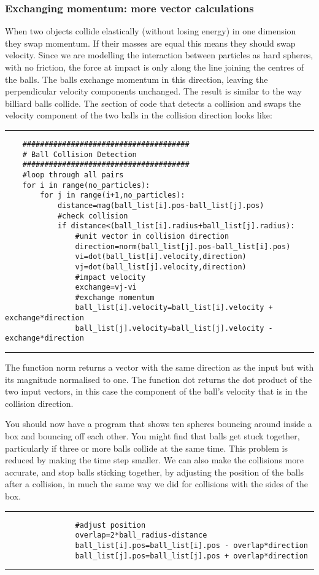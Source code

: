 \documentclass[12pt]{article}
\begin{document}
\subsubsection{Exchanging momentum: more vector calculations}
When two objects collide elastically (without losing energy) in one dimension they swap momentum.
If their masses are equal this means they should swap velocity.
Since we are modelling the interaction between particles as hard spheres,
with no friction, the force at impact is only along the line joining the centres of the balls.
The balls exchange momentum in this direction,
leaving the perpendicular velocity components unchanged.
The result is similar to the way billiard balls collide.
The section of code that detects a collision and swaps the velocity component of the two balls
in the collision direction looks like:
{\color{code}\hrule
\begin{verbatim}
    ######################################
    # Ball Collision Detection
    ######################################
    #loop through all pairs
    for i in range(no_particles):
        for j in range(i+1,no_particles):
            distance=mag(ball_list[i].pos-ball_list[j].pos)
            #check collision
            if distance<(ball_list[i].radius+ball_list[j].radius):
                #unit vector in collision direction
                direction=norm(ball_list[j].pos-ball_list[i].pos)
                vi=dot(ball_list[i].velocity,direction)
                vj=dot(ball_list[j].velocity,direction)
                #impact velocity
                exchange=vj-vi
                #exchange momentum
                ball_list[i].velocity=ball_list[i].velocity + exchange*direction
                ball_list[j].velocity=ball_list[j].velocity - exchange*direction
\end{verbatim}\hrule}
The function {\color{code}norm} returns a vector with the same direction as the input
but with its magnitude normalised to one.
The function {\color{code}dot} returns the dot product of the two input vectors,
in this case the component of the ball's velocity that is in the collision direction.

You should now have a program that shows ten spheres bouncing around inside a box
and bouncing off each other.
You might find that balls get stuck together,
particularly if three or more balls collide at the same time.
This problem is reduced by making the time step smaller.
We can also make the collisions more accurate, and stop balls sticking together,
by adjusting the position of the balls after a collision, in much the same way we did
for collisions with the sides of the box.
{\color{code}\hrule
\begin{verbatim}
                #adjust position
                overlap=2*ball_radius-distance
                ball_list[i].pos=ball_list[i].pos - overlap*direction
                ball_list[j].pos=ball_list[j].pos + overlap*direction
\end{verbatim}\hrule}
\end{document}
